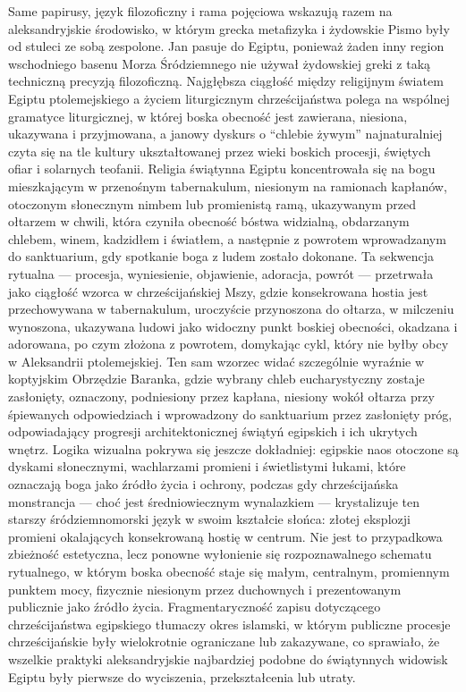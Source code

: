 Same papirusy, język filozoficzny i rama pojęciowa wskazują razem na aleksandryjskie środowisko, w którym grecka metafizyka i żydowskie Pismo były od stuleci ze sobą zespolone.
Jan pasuje do Egiptu, ponieważ żaden inny region wschodniego basenu Morza Śródziemnego nie używał żydowskiej greki z taką techniczną precyzją filozoficzną.
Najgłębsza ciągłość między religijnym światem Egiptu ptolemejskiego a życiem liturgicznym chrześcijaństwa polega na wspólnej gramatyce liturgicznej, w której boska obecność jest zawierana, niesiona, ukazywana i przyjmowana, a janowy dyskurs o ``chlebie żywym'' najnaturalniej czyta się na tle kultury ukształtowanej przez wieki boskich procesji, świętych ofiar i solarnych teofanii.
Religia świątynna Egiptu koncentrowała się na bogu mieszkającym w przenośnym tabernakulum, niesionym na ramionach kapłanów, otoczonym słonecznym nimbem lub promienistą ramą, ukazywanym przed ołtarzem w chwili, która czyniła obecność bóstwa widzialną, obdarzanym chlebem, winem, kadzidłem i światłem, a następnie z powrotem wprowadzanym do sanktuarium, gdy spotkanie boga z ludem zostało dokonane.
Ta sekwencja rytualna — procesja, wyniesienie, objawienie, adoracja, powrót — przetrwała jako ciągłość wzorca w chrześcijańskiej Mszy, gdzie konsekrowana hostia jest przechowywana w tabernakulum, uroczyście przynoszona do ołtarza, w milczeniu wynoszona, ukazywana ludowi jako widoczny punkt boskiej obecności, okadzana i adorowana, po czym złożona z powrotem, domykając cykl, który nie byłby obcy w Aleksandrii ptolemejskiej.
Ten sam wzorzec widać szczególnie wyraźnie w koptyjskim Obrzędzie Baranka, gdzie wybrany chleb eucharystyczny zostaje zasłonięty, oznaczony, podniesiony przez kapłana, niesiony wokół ołtarza przy śpiewanych odpowiedziach i wprowadzony do sanktuarium przez zasłonięty próg, odpowiadający progresji architektonicznej świątyń egipskich i ich ukrytych wnętrz.
Logika wizualna pokrywa się jeszcze dokładniej: egipskie naos otoczone są dyskami słonecznymi, wachlarzami promieni i świetlistymi łukami, które oznaczają boga jako źródło życia i ochrony, podczas gdy chrześcijańska monstrancja — choć jest średniowiecznym wynalazkiem — krystalizuje ten starszy śródziemnomorski język w swoim kształcie słońca: złotej eksplozji promieni okalających konsekrowaną hostię w centrum.
Nie jest to przypadkowa zbieżność estetyczna, lecz ponowne wyłonienie się rozpoznawalnego schematu rytualnego, w którym boska obecność staje się małym, centralnym, promiennym punktem mocy, fizycznie niesionym przez duchownych i prezentowanym publicznie jako źródło życia.
Fragmentaryczność zapisu dotyczącego chrześcijaństwa egipskiego tłumaczy okres islamski, w którym publiczne procesje chrześcijańskie były wielokrotnie ograniczane lub zakazywane, co sprawiało, że wszelkie praktyki aleksandryjskie najbardziej podobne do świątynnych widowisk Egiptu były pierwsze do wyciszenia, przekształcenia lub utraty.
